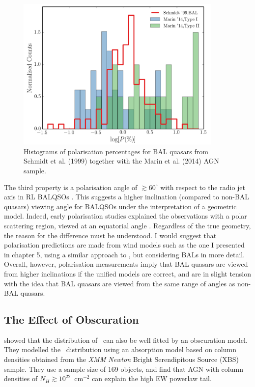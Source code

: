 \begin{figure}
\centering
\includegraphics[width=0.9\textwidth]{figures/ewpaper/hist_p2.png}
\caption
{
Histograms of polarisation percentages 
for BAL quasars from Schmidt et al. (1999) together with the 
Marin et al. (2014) AGN sample. 
}
\label{fig:bal_polarisation}
\end{figure}

The third property is a polarisation angle of $\gtrsim60^\circ$ with respect
to the radio jet axis in RL BALQSOs \citep[][and references therein]{brotherton2006}.
This suggests a higher inclination (compared to non-BAL quasars)
viewing angle for BALQSOs under the interpretation of a geometric model. Indeed,
early polarisation studies explained the observations with a polar scattering region,
viewed at an equatorial angle 
\citep[e.g.][]{goodrich1995, cohen1995,lamy2004}. Regardless of
the true geometry, the reason for the difference must be understood.
I would suggest that polarisation predictions are made from wind
models such as the one I presented in chapter 5, using a similar
approach to \cite{marin2013}, but considering BALs in more detail. 
Overall, however, polarisation measurements imply that BAL quasars are viewed
from higher inclinations if the unified models are correct, and are 
in slight tension with the idea that BAL quasars are viewed from the same range
of angles as non-BAL quasars.

\subsection{The Effect of Obscuration}
\label{sec:obscure}

\cite[][hereafter C11]{caccianiga2011} showed that the distribution of \ewo\
can also be well fitted by an obscuration model. They modelled the 
\ewo\ distribution using an absorption model based on column densities
obtained from the {\sl XMM Newton} Bright Serendipitous Source (XBS)
sample. They use a sample size of 169 objects, and find that AGN with 
column densities of $N_H\gtrsim10^{22}$~cm$^{-2}$ can explain the high
EW powerlaw tail. 

